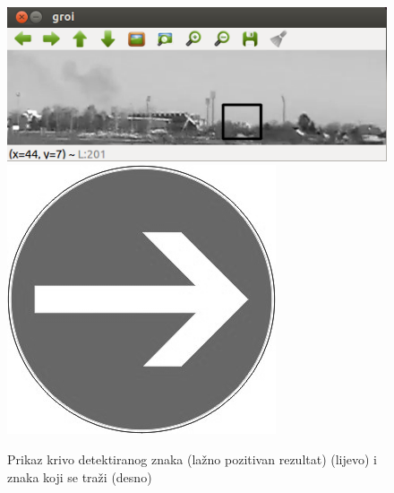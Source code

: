 \begin{figure}[!htb]
\endminipage\hfill
{}
    \includegraphics[width=\linewidth]{figures/ld1.png}
\endminipage\hfill
{}
    \includegraphics[width=\linewidth]{figures/znakg.png}
\endminipage\hfill
{}
\endminipage\hfill
\caption{Prikaz krivo detektiranog znaka (lažno pozitivan rezultat)
(lijevo) i znaka koji se traži (desno)}
\label{fig:ld1}
\end{figure}





